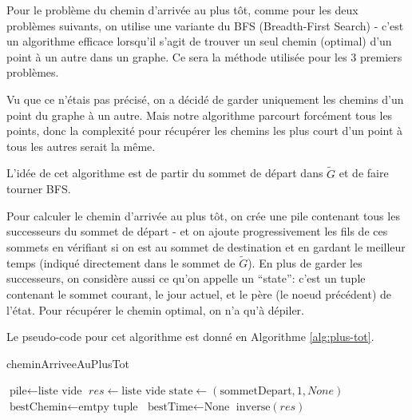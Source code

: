 Pour le problème du chemin d'arrivée au plus tôt, comme pour les deux problèmes
suivants, on utilise une variante du BFS (Breadth-First Search) - c'est un
algorithme efficace lorsqu'il s'agit de trouver un seul chemin (optimal) d'un
point à un autre dans un graphe. Ce sera la méthode utilisée pour les 3 premiers
problèmes.

Vu que ce n'étais pas précisé, on a décidé de garder uniquement les chemins d'un
point du graphe à un autre. Mais notre algorithme parcourt forcément tous les
points, donc la complexité pour récupérer les chemins les plus court d'un point
à tous les autres serait la même.

L'idée de cet algorithme est de partir du sommet de départ dans $\tilde{G}$ et
de faire tourner BFS.

Pour calculer le chemin d'arrivée au plus tôt, on crée une pile contenant tous
les successeurs du sommet de départ - et on ajoute progressivement les fils de
ces sommets en vérifiant si on est au sommet de destination et en gardant le
meilleur temps (indiqué directement dans le sommet de $\tilde{G}$). En plus de
garder les successeurs, on considère aussi ce qu'on appelle un ``state'': c'est
un tuple contenant le sommet courant, le jour actuel, et le père (le noeud
précédent) de l'état. Pour récupérer le chemin optimal, on n'a qu'à dépiler.

Le pseudo-code pour cet algorithme est donné en Algorithme \ref{alg:plus-tot}.

\begin{algorithm}[h!]
\caption{cheminArriveeAuPlusTot}\label{alg:plus-tot}

$\text{pile} \gets \text{liste vide}$\;
$res \gets \text{liste vide}$\;
$\text{state} \gets (\text{sommetDepart}, 1, None)$\;
$\text{bestChemin} \gets \text{emtpy tuple}$\;
$\text{bestTime} \gets \text{None}$\;
$\text{inverse}(res)$\;
\end{algorithm}


